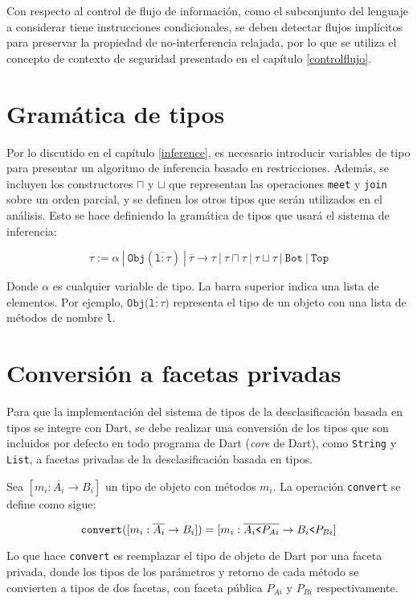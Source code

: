 Con respecto al control de flujo de información, como el subconjunto del lenguaje a considerar tiene instrucciones condicionales, se deben detectar flujos implícitos para preservar la propiedad de no-interferencia relajada, por lo que se utiliza el concepto de contexto de seguridad presentado en el capítulo \ref{controlflujo}.
\clearpage
\section{Gramática de tipos}
Por lo discutido en el capítulo \ref{inference}, es necesario introducir variables de tipo para presentar un algoritmo de inferencia basado en restricciones. Además, se incluyen los constructores $\sqcap$ y $\sqcup$ que representan las operaciones \texttt{meet} y \texttt{join} sobre un orden parcial, y se definen los otros tipos que serán utilizados en el análisis. Esto se hace definiendo la gramática de tipos que usará el sistema de inferencia:

  \[\mathtt{\tau := \alpha\ |\ Obj(\overline{l: \tau})\ |\ \overline{\tau} \rightarrow \tau \ |\ \tau \sqcap \tau\ |\ \tau \sqcup \tau\ |\ Bot\ |\ Top}\]

Donde $\alpha$ es cualquier variable de tipo. La barra superior indica una lista de elementos. Por ejemplo, $\mathtt{Obj(\overline{l: \tau}})$ representa el tipo de un objeto con una lista de métodos de nombre \texttt{l}.

\section{Conversión a facetas privadas} \label{conv}
Para que la implementación del sistema de tipos de la desclasificación basada en tipos se integre con Dart, se debe realizar una conversión de los tipos que son incluidos por defecto en todo programa de Dart (\emph{core} de Dart), como \texttt{String} y \texttt{List}, a facetas privadas de la desclasificación basada en tipos.

Sea $[m_i: \overline{A_i} \rightarrow B_i]$ un tipo de objeto con métodos $m_i$. La operación \texttt{convert} se define como sigue:

\[
\mathtt{convert}([m_i: \overline{A_i} \rightarrow B_i]) = [m_i: \overline{A_i\text{\texttt{<}}P_{Ai}} \rightarrow B_i\text{\texttt{<}}P_{Bi}]
\]

Lo que hace \texttt{convert} es reemplazar el tipo de objeto de Dart por una faceta privada, donde los tipos de los parámetros y retorno de cada método se convierten a tipos de dos facetas, con faceta pública $P_{Ai}$ y $P_{Bi}$ respectivamente.


